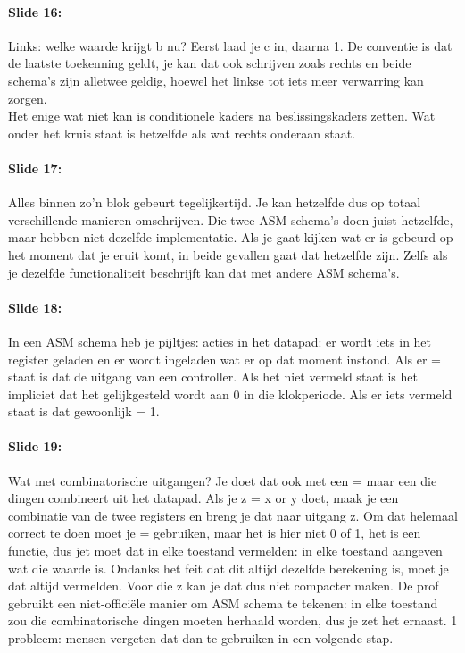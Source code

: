 \documentclass[10pt,a4paper]{book}
\begin{document}
\paragraph{Slide 16:} Links: welke waarde krijgt b nu? Eerst laad je c in, daarna 1. De conventie is dat de laatste toekenning geldt, je kan dat ook schrijven zoals rechts en beide schema's zijn alletwee geldig, hoewel het linkse tot iets meer verwarring kan zorgen.\\
Het enige wat niet kan is conditionele kaders na beslissingskaders zetten. Wat onder het kruis staat is hetzelfde als wat rechts onderaan staat.

\paragraph{Slide 17:} Alles binnen zo'n blok gebeurt tegelijkertijd. Je kan hetzelfde dus op totaal verschillende manieren omschrijven. Die twee ASM schema's doen juist hetzelfde, maar hebben niet dezelfde implementatie. Als je gaat kijken wat er is gebeurd op het moment dat je eruit komt, in beide gevallen gaat dat hetzelfde zijn. Zelfs als je dezelfde functionaliteit beschrijft kan dat met andere ASM schema's.

\paragraph{Slide 18:} In een ASM schema heb je pijltjes: acties in het datapad: er wordt iets in het register geladen en er wordt ingeladen wat er op dat moment instond. Als er = staat is dat de uitgang van een controller. Als het niet vermeld staat is het impliciet dat het gelijkgesteld wordt aan 0 in die klokperiode. Als er iets vermeld staat is dat gewoonlijk = 1.

\paragraph{Slide 19:} Wat met combinatorische uitgangen? Je doet dat ook met een = maar een die dingen combineert uit het datapad. Als je z = x or y doet, maak je een combinatie van de twee registers en breng je dat naar uitgang z. Om dat helemaal correct te doen moet je = gebruiken, maar het is hier niet 0 of 1, het is een functie, dus jet moet dat in elke toestand vermelden: in elke toestand aangeven wat die waarde is. Ondanks het feit dat dit altijd dezelfde berekening is, moet je dat altijd vermelden. Voor die z kan je dat dus niet compacter maken.
De prof gebruikt een niet-offici\"ele manier om ASM schema te tekenen: in elke toestand zou die combinatorische dingen moeten herhaald worden, dus je zet het ernaast. 1 probleem: mensen vergeten dat dan  te gebruiken in een volgende stap.
\end{document}
